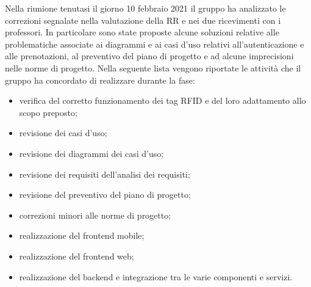 Nella riunione tenutasi il giorno 10 febbraio 2021 il gruppo ha analizzato le correzioni segnalate nella valutazione della RR e nei due ricevimenti con i professori.
In particolare sono state proposte alcune soluzioni relative alle problematiche associate ai diagrammi e ai casi d'uso relativi all'autenticazione e alle prenotazioni, 
al preventivo del piano di progetto e ad alcune imprecisioni nelle norme di progetto. Nella seguente lista vengono riportate le attività che il gruppo ha concordato di 
realizzare durante la fase:

\begin{itemize}
	\item verifica del corretto funzionamento dei tag RFID e del loro adattamento allo scopo preposto;
	\item revisione dei casi d'uso; 
	\item revisione dei diagrammi dei casi d'uso;
	\item revisione dei requisiti dell'analisi dei requisiti;
	\item revisione del preventivo del piano di progetto;
	\item correzioni minori alle norme di progetto;
	\item realizzazione del frontend mobile;
	\item realizzazione del frontend web;
	\item realizzazione del backend e integrazione tra le varie componenti e servizi.
\end{itemize}
